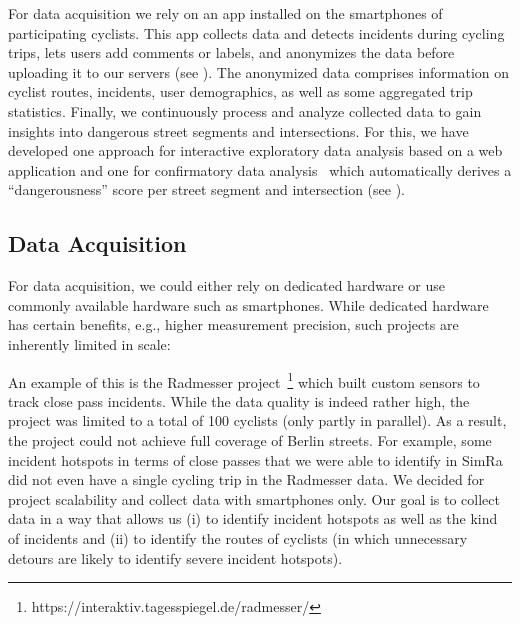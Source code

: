 For data acquisition we rely on an app installed on the smartphones of participating cyclists.
This app collects data and detects incidents during cycling trips, lets users add comments or labels, and anonymizes the data before uploading it to our servers (see ).
The anonymized data comprises information on cyclist routes, incidents, user demographics, as well as some aggregated trip statistics.
Finally, we continuously process and analyze collected data to gain insights into dangerous street segments and intersections.
For this, we have developed one approach for interactive exploratory data analysis based on a web application and one for confirmatory data analysis~\cite{bermbach2017cloud} which automatically derives a ``dangerousness'' score per street segment and intersection (see ).

\subsection{Data Acquisition}
\label{subsec:data_acquisition}
For data acquisition, we could either rely on dedicated hardware or use commonly available hardware such as smartphones.
While dedicated hardware has certain benefits, e.g., higher measurement precision, such projects are inherently limited in scale:

An example of this is the Radmesser project~\footnote{https://interaktiv.tagesspiegel.de/radmesser/} which built custom sensors to track close pass incidents.
While the data quality is indeed rather high, the project was limited to a total of 100 cyclists (only partly in parallel).
As a result, the project could not achieve full coverage of Berlin streets.
For example, some incident hotspots in terms of close passes that we were able to identify in SimRa did not even have a single cycling trip in the Radmesser data.
We decided for project scalability and collect data with smartphones only.
Our goal is to collect data in a way that allows us (i) to identify incident hotspots as well as the kind of incidents and (ii) to identify the routes of cyclists (in which unnecessary detours are likely to identify severe incident hotspots).

